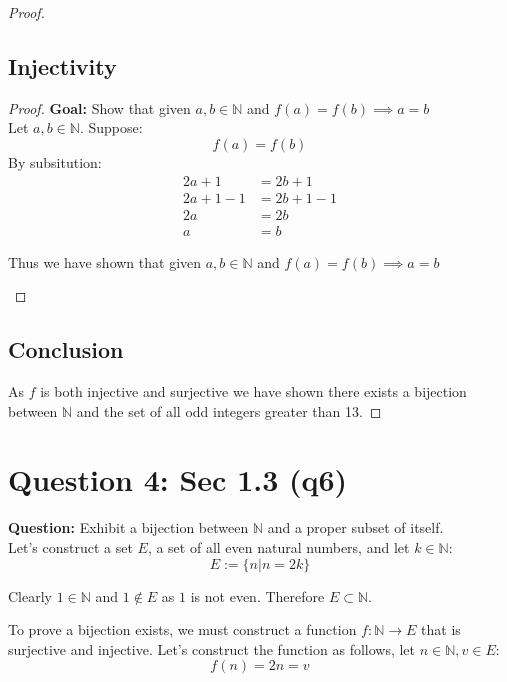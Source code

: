 \documentclass[11pt]{article}
\theoremstyle{plain}
\begin{document}
\begin{proof}
	\subsection*{Injectivity}
	\begin{proof} \textbf{Goal:} Show that given $a,b \in \mathbb{N}$ and $f(a) = f(b) \implies a = b$ \\
		Let $a,b \in \mathbb{N}$. Suppose:
		\[
			f(a) = f(b)
		\]
		By subsitution:
		\begin{align*}
			2a+1   & = 2b+1   \\
			2a+1-1 & = 2b+1-1 \\
			2a     & = 2b     \\
			a      & = b
		\end{align*}
		\begin{center}
			Thus we have shown that given $a,b \in \mathbb{N}$ and $f(a) = f(b) \implies a = b$
		\end{center}
	\end{proof}
	\subsection*{Conclusion}
	As $f$ is both injective and surjective we have shown there exists a bijection between $\mathbb{N}$ and the set of all odd integers greater than 13.
\end{proof}
\section*{Question 4: Sec 1.3 (q6)}
\textbf{Question:} Exhibit a bijection between $\mathbb{N}$ and a proper subset of itself.\\
Let's construct a set $E$, a set of all even natural numbers, and let $k \in \mathbb{N}$:
\[
	E := \{ n | n=2k \}
\]
\begin{center} Clearly $1 \in \mathbb{N}$ and $1 \not\in E$ as $1$ is not even. Therefore $E \subset \mathbb{N}$. \end{center}
To prove a bijection exists, we must construct a function $f: \mathbb{N} \rightarrow E$ that is surjective and injective.
Let's construct the function as follows, let $n \in \mathbb{N}, v \in E$:
\[
	f(n) = 2n = v
\]
\end{document}
